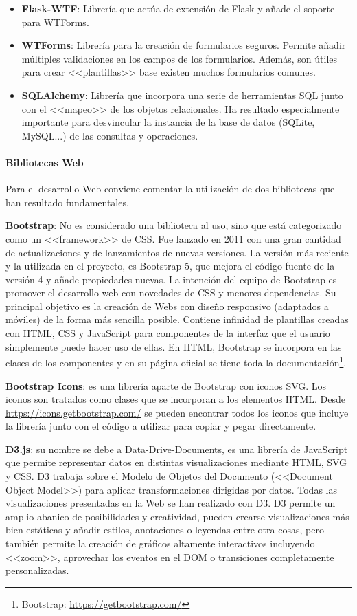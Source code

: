 \begin{itemize}
	\item \textbf{Flask-WTF}: Librería que actúa de extensión de Flask y añade
	el soporte para WTForms.
	\item \textbf{WTForms}: Librería para la creación de formularios seguros.
	Permite añadir múltiples validaciones en los campos de los formularios.
	Además, son útiles para crear <<plantillas>> base existen muchos formularios
	comunes.
	\item \textbf{SQLAlchemy}: Librería que incorpora una serie de herramientas
	SQL junto con el <<mapeo>> de los objetos relacionales. Ha resultado
	especialmente importante para desvincular la instancia de la base de datos
	(SQLite, MySQL...) de las consultas y operaciones.
\end{itemize}

\paragraph{Bibliotecas Web} Para el desarrollo Web conviene comentar la
utilización de dos bibliotecas que han resultado fundamentales.

\textbf{Bootstrap}: No es considerado una biblioteca al uso, sino que está
categorizado como un <<framework>> de CSS. Fue lanzado en 2011 con una gran
cantidad de actualizaciones y de lanzamientos de nuevas versiones. La versión
más reciente y la utilizada en el proyecto, es Bootstrap 5, que mejora el código
fuente de la versión 4 y añade propiedades nuevas. La intención del equipo de
Bootstrap es promover el desarrollo web con novedades de CSS y menores
dependencias. Su principal objetivo es la creación de Webs con diseño responsivo
(adaptados a móviles) de la forma más sencilla posible. Contiene infinidad de
plantillas creadas con HTML, CSS y JavaScript para componentes de la interfaz
que el usuario simplemente puede hacer uso de ellas. En HTML, Bootstrap se
incorpora en las clases de los componentes y en su página oficial se tiene toda
la documentación\footnote{Bootstrap: \url{https://getbootstrap.com/}}.

\textbf{Bootstrap Icons}: es una librería aparte de Bootstrap con iconos SVG.
Los iconos son tratados como clases que se incorporan a los elementos HTML.
Desde \url{https://icons.getbootstrap.com/} se pueden encontrar todos los iconos
que incluye la librería junto con el código a utilizar para copiar y pegar
directamente.

\textbf{D3.js}: su nombre se debe a Data-Drive-Documents, es una librería de
JavaScript que permite representar datos en distintas visualizaciones mediante
HTML, SVG y CSS. D3 trabaja sobre el Modelo de Objetos del Documento (<<Document
Object Model>>) para aplicar transformaciones dirigidas por datos. Todas las
visualizaciones presentadas en la Web se han realizado con D3. D3 permite un
amplio abanico de posibilidades y creatividad, pueden crearse visualizaciones
más bien estáticas y añadir estilos, anotaciones o leyendas entre otra cosas,
pero también permite la creación de gráficos altamente interactivos incluyendo
<<zoom>>, aprovechar los eventos en el DOM o transiciones completamente
personalizadas.


